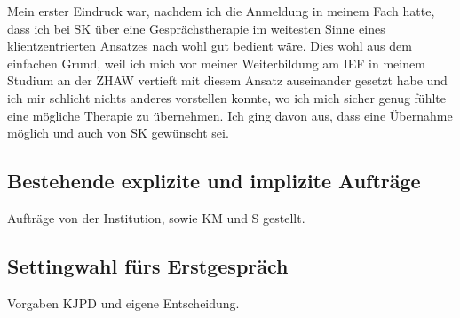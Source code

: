 Mein erster Eindruck war, nachdem ich die Anmeldung in meinem Fach hatte, dass ich bei SK über eine Gesprächstherapie im weitesten Sinne eines klientzentrierten Ansatzes nach  wohl gut bedient wäre. Dies wohl aus dem einfachen Grund, weil ich mich vor meiner Weiterbildung am IEF in meinem Studium an der ZHAW vertieft mit diesem Ansatz auseinander gesetzt habe und ich mir schlicht nichts anderes vorstellen konnte, wo ich mich sicher genug fühlte eine mögliche Therapie zu übernehmen. Ich ging  davon aus, dass eine Übernahme möglich und auch von SK gewünscht sei. 

\subsection{Bestehende explizite und implizite Aufträge} Aufträge von der Institution, sowie KM und S gestellt. 
\subsection{Settingwahl fürs Erstgespräch} Vorgaben KJPD und eigene Entscheidung.

